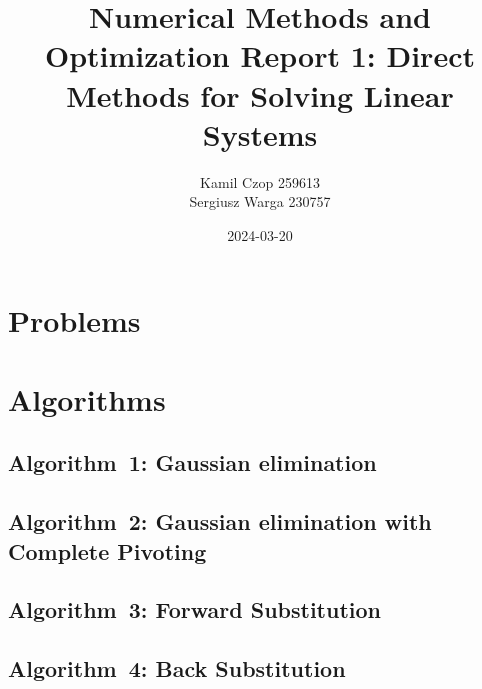 \documentclass[a4paper]{article}
\title{Numerical Methods and Optimization Report 1:
  Direct Methods for Solving Linear Systems}
\author{Kamil Czop 259613\\Sergiusz Warga 230757}
\date{2024-03-20}
\begin{document}
\maketitle
\tableofcontents
\pagebreak

\section{Problems}






% 

\clearpage

\section{Algorithms}
\subsection{Algorithm~1: Gaussian elimination}%
\label{algorithm:1}

\subsection{Algorithm~2: Gaussian  elimination  with  Complete  Pivoting}%
\label{algorithm:2}

\subsection{Algorithm~3: Forward Substitution}%
\label{algorithm:3}

\subsection{Algorithm~4: Back Substitution}%
\label{algorithm:4}

\end{document}
